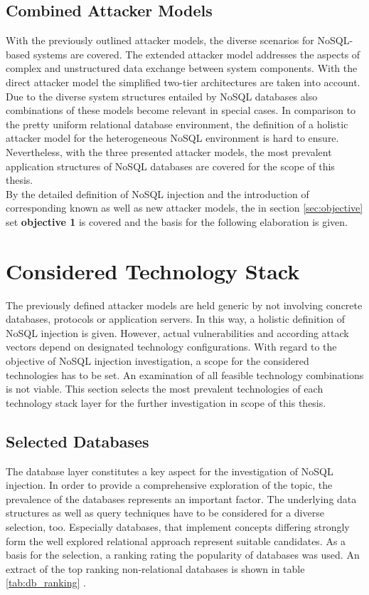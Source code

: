 \subsection{Combined Attacker Models}
With the previously outlined attacker models, the diverse scenarios for NoSQL-based systems are covered. The extended attacker model addresses the aspects of complex and unstructured data exchange between system components. With the direct attacker model the simplified two-tier architectures are taken into account. Due to the diverse system structures entailed by NoSQL databases also combinations of these models become relevant in special cases. In comparison to the pretty uniform relational database environment, the definition of a holistic attacker model for the heterogeneous NoSQL environment is hard to ensure. Nevertheless, with the three presented attacker models, the most prevalent application structures of NoSQL databases are covered for the scope of this thesis. \\

By the detailed definition of NoSQL injection and the introduction of corresponding known as well as new attacker models, the in section \ref{sec:objective} set \textbf{objective 1} is covered and the basis for the following elaboration is given.


\section{Considered Technology Stack}

The previously defined attacker models are held generic by not involving concrete databases, protocols or application servers. In this way, a holistic definition of NoSQL injection is given. However, actual vulnerabilities and according attack vectors depend on designated technology configurations. With regard to the objective of NoSQL injection investigation, a scope for the considered technologies has to be set. An examination of all feasible technology combinations is not viable. This section selects the most prevalent technologies of each technology stack layer for the further investigation in scope of this thesis.

\subsection{Selected Databases}
The database layer constitutes a key aspect for the investigation of NoSQL injection. In order to provide a comprehensive exploration of the topic, the prevalence of the databases represents an important factor. The underlying data structures as well as query techniques have to be considered for a diverse selection, too. Especially databases, that implement concepts differing strongly form the well explored relational approach represent suitable candidates. As a basis for the selection, a ranking rating the popularity of databases was used. An extract of the top ranking non-relational databases is shown in table \ref{tab:db_ranking} \cite{Solid2016}.

